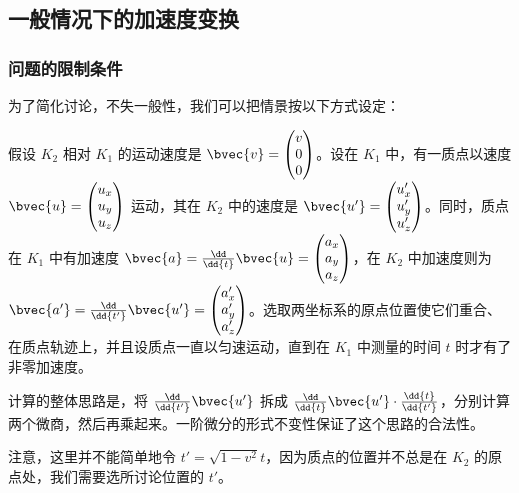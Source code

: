 


\subsection{一般情况下的加速度变换}
\subsubsection{问题的限制条件}

为了简化讨论，不失一般性，我们可以把情景按以下方式设定：

假设 $K_2$ 相对 $K_1$ 的运动速度是 $\bvec{v}=\left(\begin{matrix}v\\0\\0\end{matrix} \right) $。设在 $K_1$ 中，有一质点以速度 $\bvec{u}=\left(\begin{matrix}u_x\\u_y\\u_z\end{matrix} \right)$ 运动，其在 $K_2$ 中的速度是 $\bvec{u'}=\left(\begin{matrix}u_x'\\u_y'\\u_z'\end{matrix} \right) $。同时，质点在 $K_1$ 中有加速度 $\bvec{a}=\frac{\dd}{\dd{t}}\bvec{u}=\left(\begin{matrix}a_x\\a_y\\a_z\end{matrix} \right)$，在 $K_2$ 中加速度则为 $\bvec{a'}=\frac{\dd}{\dd{t'}}\bvec{u'}=\left(\begin{matrix}a_x'\\a_y'\\a_z'\end{matrix} \right)$。选取两坐标系的原点位置使它们重合、在质点轨迹上，并且设质点一直以匀速运动，直到在 $K_1$ 中测量的时间 $t$ 时才有了非零加速度。

计算的整体思路是，将 $\frac{\dd}{\dd{t'}}\bvec{u'}$ 拆成 $\frac{\dd}{\dd{t}}\bvec{u'}\cdot\frac{\dd{t}}{\dd{t'}}$，分别计算两个微商，然后再乘起来。一阶微分的形式不变性保证了这个思路的合法性。

注意，这里并不能简单地令 $t'=\sqrt{1-v^2}t$，因为质点的位置并不总是在 $K_2$ 的原点处，我们需要选所讨论位置的 $t'$。

